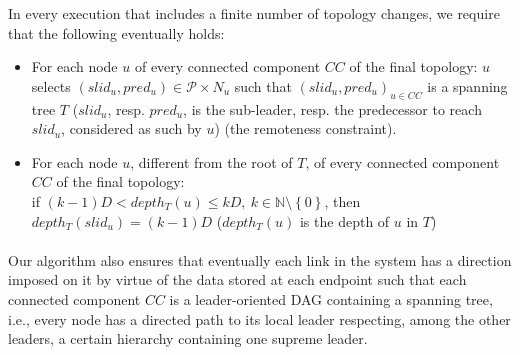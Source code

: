 In every execution that includes a finite number of topology changes, we require that the following eventually holds:

\begin{itemize}
	\item For each node $u$ of every connected component $CC$ of the final topology:
	$u$ selects ${(slid_u, pred_u) \in \mathcal{P} \times N_u}$ such that ${(slid_u, pred_u)}_{u \in CC}$ is a spanning tree $T$ ($slid_u$, resp. $pred_u$, is the sub-leader, resp. the predecessor to reach $slid_u$, considered as such by $u$) (the remoteness constraint).
	\item For each node $u$, different from the root of $T$, of every connected component $CC$ of the final topology:\\
	if $ (k-1)D < depth_T (u) \leq kD,~k \in  \mathbb{N} \setminus \left\lbrace 0 \right\rbrace $, then $ depth_T(slid_u)=(k-1)D$ ($depth_T(u)$ is the depth of $u$ in $T$)
\end{itemize}

\paragraph{}Our algorithm also ensures that eventually each link in the system has a direction imposed on it by virtue of the data stored at each endpoint such that each connected component $CC$ is a leader-oriented DAG containing a spanning tree, i.e., every node has a directed path to its local leader respecting, among the other leaders, a certain hierarchy containing one supreme leader.